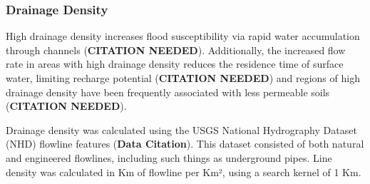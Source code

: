 \documentclass[
]{agujournal2019}
\begin{document}
\subsubsection{Drainage Density}\label{drainage-density}

High drainage density increases flood susceptibility via rapid water
accumulation through channels (\textbf{CITATION NEEDED}). Additionally,
the increased flow rate in areas with high drainage density reduces the
residence time of surface water, limiting recharge potential
(\textbf{CITATION NEEDED}) and regions of high drainage density have
been frequently associated with less permeable soils (\textbf{CITATION
NEEDED}).

Drainage density was calculated using the USGS National Hydrography
Dataset (NHD) flowline features (\textbf{Data Citation}). This dataset
consisted of both natural and engineered flowlines, including such
things as underground pipes. Line density was calculated in Km of
flowline per Km², using a search kernel of 1 Km.
\end{document}
